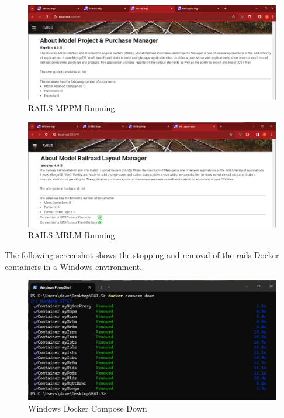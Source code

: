 \begin{figure}[H]
    \centering
    \includegraphics[scale=0.42]{../Images/mppm-home.png}
    \caption{RAILS MPPM Running}
    \label{fig:rails-mrim}
\end{figure}
\begin{figure}[H]
    \centering
    \includegraphics[scale=0.42]{../Images/mrlm-home.png}
    \caption{RAILS MRLM Running}
    \label{fig:rails-rsrm}
\end{figure}
The following screenshot shows the stopping and removal of the \gls{rails} Docker containers in a Windows environment.
\begin{figure}[H]
    \centering
    \includegraphics[scale=0.5]{../Images/dc-down-win.png}
    \caption{Windows Docker Compose Down}
    \label{fig:docker-cmds-3}
\end{figure}
\newpage
